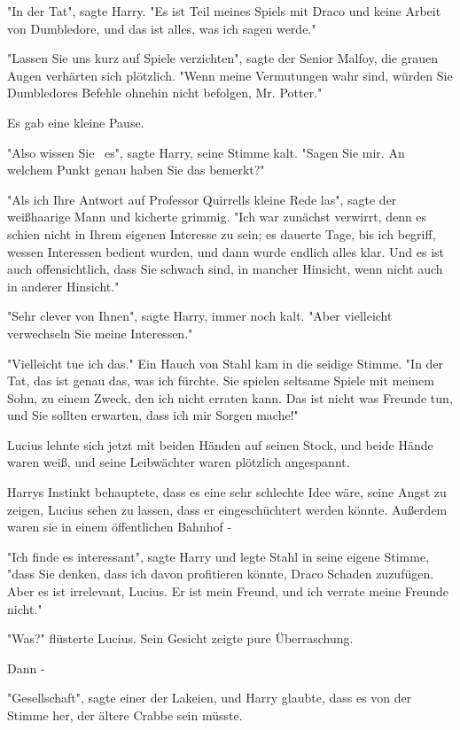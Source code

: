 {"In der Tat", sagte Harry. "Es ist Teil meines Spiels mit Draco und keine Arbeit von Dumbledore, und das ist alles, was ich sagen werde."

"Lassen Sie uns kurz auf Spiele verzichten", sagte der Senior Malfoy, die grauen Augen verhärten sich plötzlich. "Wenn meine Vermutungen wahr sind, würden Sie Dumbledores Befehle ohnehin nicht befolgen, Mr. Potter."

Es gab eine kleine Pause.

"Also wissen Sie ~es", sagte Harry, seine Stimme kalt. "Sagen Sie mir. An welchem Punkt genau haben Sie das bemerkt?"

"Als ich Ihre Antwort auf Professor Quirrells kleine Rede las", sagte der weißhaarige Mann und kicherte grimmig. "Ich war zunächst verwirrt, denn es schien nicht in Ihrem eigenen Interesse zu sein; es dauerte Tage, bis ich begriff, wessen Interessen bedient wurden, und dann wurde endlich alles klar. Und es ist auch offensichtlich, dass Sie schwach sind, in mancher Hinsicht, wenn nicht auch in anderer Hinsicht."

"Sehr clever von Ihnen", sagte Harry, immer noch kalt. "Aber vielleicht verwechseln Sie meine Interessen."

"Vielleicht tue ich das." Ein Hauch von Stahl kam in die seidige Stimme. "In der Tat, das ist genau das, was ich fürchte. Sie spielen seltsame Spiele mit meinem Sohn, zu einem Zweck, den ich nicht erraten kann. Das ist nicht was Freunde tun, und Sie sollten erwarten, dass ich mir Sorgen mache!"

Lucius lehnte sich jetzt mit beiden Händen auf seinen Stock, und beide Hände waren weiß, und seine Leibwächter waren plötzlich angespannt.

Harrys Instinkt behauptete, dass es eine sehr schlechte Idee wäre, seine Angst zu zeigen, Lucius sehen zu lassen, dass er eingeschüchtert werden könnte. Außerdem waren sie in einem öffentlichen Bahnhof -

"Ich finde es interessant", sagte Harry und legte Stahl in seine eigene Stimme, "dass Sie denken, dass ich davon profitieren könnte, Draco Schaden zuzufügen. Aber es ist irrelevant, Lucius. Er ist mein Freund, und ich verrate meine Freunde nicht."

"Was?" flüsterte Lucius. Sein Gesicht zeigte pure Überraschung.

Dann -

"Gesellschaft", sagte einer der Lakeien, und Harry glaubte, dass es von der Stimme her, der ältere Crabbe sein müsste.

}
